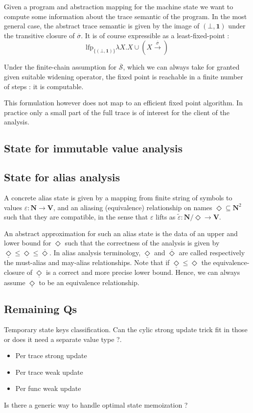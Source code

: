 \documentclass[14pt]{article}
\newcommand{\eps}{\varepsilon}
\newcommand{\D}{\Diamond}
\newcommand{\uD}{\underline{\Diamond}}
\newcommand{\UD}{\overline{\Diamond}}
\begin{document}
Given a program and abstraction mapping for the machine state we want to compute some information about the trace semantic of the program. In the most general case, the abstract trace semantic is given by the image of $(\bot,\mathbf{1})$ under the transitive closure of $\overline{\sigma}$. It is of course expressible as a least-fixed-point :
\[ \text{lfp}_{\{(\bot,\mathbf{1})\}}\lambda X. X\cup\left(X\xrightarrow{\overline{\sigma}}\right)\]

Under the finite-chain assumption for $\overline{\mathcal{S}}$, which we can always take for granted given suitable widening operator, the fixed point is reachable in a finite number of steps : it is computable.

This formulation however does not map to an efficient fixed point algorithm. In practice only a small part of the full trace is of interest for the client of the analysis.

\subsection{State for immutable value analysis}


\subsection{State for alias analysis}

A concrete alias state is given by a mapping from finite string of symbols to values $\eps:\mathbf{N}\to\mathbf{V}$, and an aliasing (equivalence) relationship on names $\D \subseteq \mathbf{N}^2$ such that they are compatible, in the sense that $\eps$ lifts as $\tilde{\eps} : \mathbf{N}/\D \to \mathbf{V}$.

An abstract approximation for such an alias state is the data of an upper and lower bound for $\D$ such that the correctness of the analysis is given by $\uD\leq\D\leq\UD$. In alias analysis terminology, $\uD$ and $\UD$ are called respectively the must-alias and may-alias relationships. Note that if $\uD\leq\D$ the equivalence-closure of $\uD$ is a correct and more precise lower bound. Hence, we can always assume $\uD$ to be an equivalence relationship.

\subsection{Remaining Qs}

Temporary state keys classification. Can the cylic strong update trick fit in those or does it need a separate value type ?.
\begin{itemize}
\item Per trace strong update
\item Per trace weak update
\item Per func weak update
\end{itemize}

Is there a generic way to handle optimal state memoization ?



\end{document}

